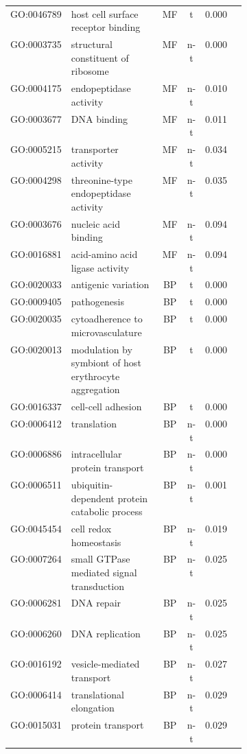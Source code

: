 \begin{table}
\begin{center}
\begin{tabular}{lp{0.4\linewidth}cccc}
GO:0046789 & host cell surface receptor binding & MF & t & 0.000\\
GO:0003735 & structural constituent of ribosome & MF & n-t & 0.000\\
GO:0004175 & endopeptidase activity & MF & n-t & 0.010\\
GO:0003677 & DNA binding & MF & n-t & 0.011\\
GO:0005215 & transporter activity & MF & n-t & 0.034\\
GO:0004298 & threonine-type endopeptidase activity & MF & n-t & 0.035\\
GO:0003676 & nucleic acid binding & MF & n-t & 0.094\\
GO:0016881 & acid-amino acid ligase activity & MF & n-t & 0.094\\
GO:0020033 & antigenic variation & BP & t & 0.000\\
GO:0009405 & pathogenesis & BP & t & 0.000\\
GO:0020035 & cytoadherence to microvasculature& BP & t & 0.000\\
GO:0020013 & modulation by symbiont of host erythrocyte aggregation & BP & t & 0.000\\
GO:0016337 & cell-cell adhesion & BP & t & 0.000\\
GO:0006412 & translation & BP & n-t & 0.000\\
GO:0006886 & intracellular protein transport & BP & n-t & 0.000\\
GO:0006511 & ubiquitin-dependent protein catabolic process & BP & n-t & 0.001\\
GO:0045454 & cell redox homeostasis & BP & n-t & 0.019\\
GO:0007264 & small GTPase mediated signal transduction & BP & n-t & 0.025\\
GO:0006281 & DNA repair & BP & n-t & 0.025\\
GO:0006260 & DNA replication & BP & n-t & 0.025\\
GO:0016192 & vesicle-mediated transport & BP & n-t & 0.027\\
GO:0006414 & translational elongation & BP & n-t & 0.029\\
GO:0015031 & protein transport & BP & n-t & 0.029\\
\hline
\end{tabular}
\end{center}
\label{table:RingsFirstPro}
\end{table}
\clearpage

